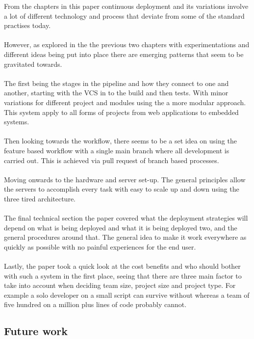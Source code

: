 From the chapters in this paper continuous deployment and its variations involve a lot of different technology and process that deviate from some of the standard practises today.
\\\\
However, as explored in the the previous two chapters with experimentations and different ideas being put into place there are emerging patterns that seem to be gravitated towards.
\\\\
The first being the stages in the pipeline and how they connect to one and another, starting with the VCS in to the build and then tests. With minor variations for different project and modules using the a more modular approach. This system apply to all forms of projects from web applications to embedded systems.
\\\\
Then looking towards the workflow, there seems to be a set idea on using the feature based workflow with a single main branch where all development is carried out. This is achieved via pull request of branch based processes.
\\\\
Moving onwards to the hardware and server set-up. The general principles allow the servers to accomplish every task with easy to scale up and down using the three tired architecture.
\\\\
The final technical section the paper covered what the deployment strategies will depend on what is being deployed and what it is being deployed two, and the general procedures around that. The general idea to make it work everywhere as quickly as possible with no painful experiences for the end user.
\\\\
Lastly, the paper took a quick look at the cost benefits and who should bother with such a system in the first place, seeing that there are three main factor to take into account when deciding team size, project size and project type. For example a solo developer on a small script can survive without whereas a team of five hundred on  a million plus lines of code probably cannot.

\subsection{Future work}

